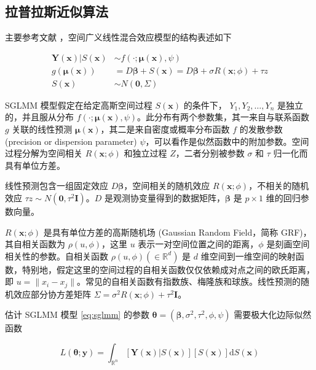 \documentclass[12pt,a4paper,UTF8,twoside]{book}
\theoremstyle{definition}
\theoremstyle{definition}
\theoremstyle{definition}
\theoremstyle{remark}
\begin{document}
\hypertarget{LA}{%
\subsection{拉普拉斯近似算法}\label{LA}}

主要参考文献
\citep{Bonat2016Practical}，空间广义线性混合效应模型的结构表述如下

\begin{equation}
\begin{aligned}
\mathbf{Y(x)} | S(\mathbf{x}) & \sim  f(\cdot;\boldsymbol{\mu(x)},\psi) \\
g(\boldsymbol{\mu(x)}) & =  D\boldsymbol{\beta} + S(\mathbf{x}) 
                         = D\boldsymbol{\beta} + \sigma R(\mathbf{x};\phi) + \tau z \\
S(\mathbf{x}) & \sim  N(\mathbf{0},\Sigma)
\end{aligned} \label{eq:sglmm}
\end{equation}

SGLMM 模型假定在给定高斯空间过程 \(S(\mathbf{x})\) 的条件下，
\(Y_1,Y_2,\ldots,Y_n\) 是独立的，并且服从分布
\(f(\cdot;\boldsymbol{\mu(x)},\psi)\)。此分布有两个参数集，其一来自与联系函数
\(g\) 关联的线性预测
\(\boldsymbol{\mu(x)}\)，其二是来自密度或概率分布函数 \(f\) 的发散参数
(precision or dispersion parameter)
\(\psi\)，可以看作是似然函数中的附加参数。空间过程分解为空间相关
\(R(\mathbf{x};\phi)\) 和独立过程 \(Z\)，二者分别被参数 \(\sigma\) 和
\(\tau\) 归一化而具有单位方差。

线性预测包含一组固定效应 \(D\boldsymbol{\beta}\)，空间相关的随机效应
\(R(\mathbf{x};\phi)\)，不相关的随机效应
\(\tau z \sim N(\mathbf{0},\tau^2\mathbf{I})\)。\(D\)
是观测协变量得到的数据矩阵，\(\boldsymbol{\beta}\) 是 \(p \times 1\)
维的回归参数向量。

\(R(\mathbf{x};\phi)\) 是具有单位方差的高斯随机场 (Gaussian Random
Field，简称 GRF)，其自相关函数为 \(\rho(u,\phi)\)，这里 \(u\)
表示一对空间位置之间的距离，\(\phi\) 是刻画空间相关性的参数。自相关函数
\(\rho(u,\phi) (\in \mathbb{R}^d)\) 是 \(d\)
维空间到一维空间的映射函数，特别地，假定这里的空间过程的自相关函数仅仅依赖成对点之间的欧氏距离，即
\(u =\|x_i - x_j\|\)。常见的自相关函数有指数族、梅隆族和球族。线性预测的随机效应部分协方差矩阵
\(\Sigma = \sigma^2 R(\mathbf{x};\phi) + \tau^2\mathbf{I}\)。

估计 SGLMM 模型 \eqref{eq:sglmm} 的参数
\(\boldsymbol{\theta} = (\boldsymbol{\beta},\sigma^2,\tau^2,\phi,\psi)\)
需要极大化边际似然函数

\begin{equation}
L(\boldsymbol{\theta};\mathbf{y}) = \int_{\mathbb{R}^n} [\mathbf{Y(x)}|S(\mathbf{x})][S(\mathbf{x})]\mathrm{d}S(\mathbf{x}) \label{eq:marginal-likelihood}
\end{equation}
\end{document}
